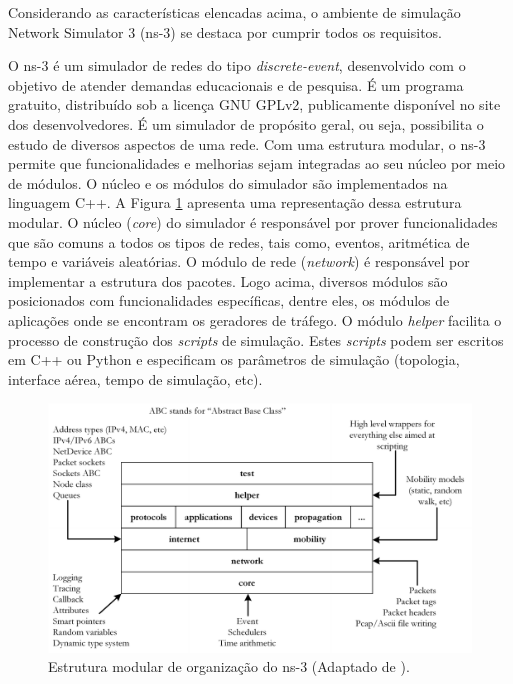 Considerando as características elencadas acima, o ambiente de simulação Network Simulator 3 (ns-3) \cite{ns3-2021} se destaca por cumprir todos os requisitos.

O ns-3 é um simulador de redes do tipo \textit{discrete-event}, desenvolvido com o objetivo de atender demandas educacionais e de pesquisa. É um programa gratuito, distribuído sob a licença GNU GPLv2, publicamente disponível no site dos desenvolvedores. É um simulador de propósito geral, ou seja, possibilita o estudo de diversos aspectos de uma rede. Com uma estrutura modular, o ns-3 permite que funcionalidades e melhorias sejam integradas ao seu núcleo por meio de módulos. O núcleo e os módulos do simulador são implementados na linguagem C++. A Figura \ref{fig:ns-3-organization} apresenta uma representação dessa estrutura modular. O núcleo (\textit{core}) do simulador é responsável por prover funcionalidades que são comuns a todos os tipos de redes, tais como, eventos, aritmética de tempo e variáveis aleatórias. O módulo de rede (\textit{network}) é responsável por implementar a estrutura dos pacotes. Logo acima, diversos módulos são posicionados com funcionalidades específicas, dentre eles, os módulos de aplicações onde se encontram os geradores de tráfego. O módulo \textit{helper} facilita o processo de construção dos \textit{scripts} de simulação. Estes \textit{scripts} podem ser escritos em C++ ou Python e especificam os parâmetros de simulação (topologia, interface aérea, tempo de simulação, etc). 

\begin{figure}
	\centering
	\includegraphics[scale=0.7]{textuais/ns-3-organization.pdf}
	\caption[Estrutura modular de organização do ns-3.]{Estrutura modular de organização do ns-3 (Adaptado de \cite{ns3-2021}).
		\label{fig:ns-3-organization}}
\end{figure}

